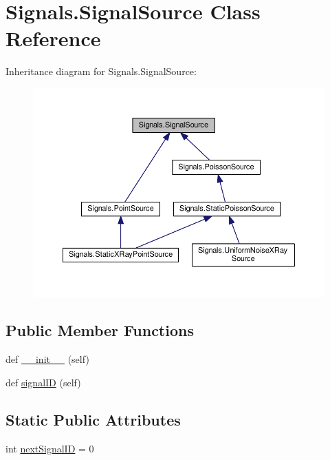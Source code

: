 \hypertarget{classSignals_1_1SignalSource}{}\section{Signals.\+Signal\+Source Class Reference}
\label{classSignals_1_1SignalSource}


Inheritance diagram for Signals.\+Signal\+Source\+:\nopagebreak
\begin{figure}[H]
\begin{center}
\leavevmode
\includegraphics[width=350pt]{classSignals_1_1SignalSource__inherit__graph}
\end{center}
\end{figure}
\subsection*{Public Member Functions}
\begin{DoxyCompactItemize}
\item 
def \hyperlink{classSignals_1_1SignalSource_a18e58f799786c10300d066e9e0de7236}{\+\_\+\+\_\+init\+\_\+\+\_\+} (self)
\item 
def \hyperlink{classSignals_1_1SignalSource_a85016cca8a7f1e188d314ced50577d05}{signal\+ID} (self)
\end{DoxyCompactItemize}
\subsection*{Static Public Attributes}
\begin{DoxyCompactItemize}
\item 
int \hyperlink{classSignals_1_1SignalSource_abcff0d069f17cb5ebe3eff15b6283a64}{next\+Signal\+ID} = 0
\end{DoxyCompactItemize}
